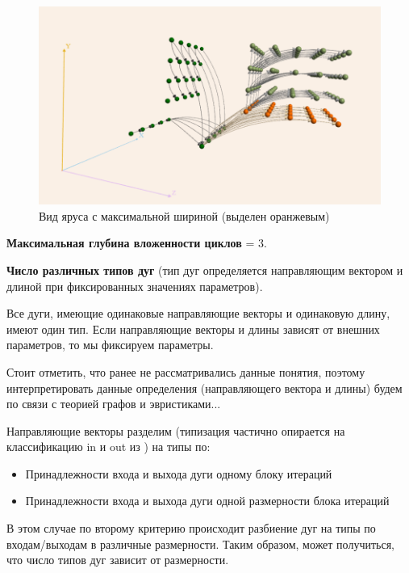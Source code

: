 \documentclass[12pt, fleqn]{article}
\theoremstyle{definition}
\newenvironment{packed_enum}{
\begin{enumerate}
  \setlength{\itemsep}{1pt}
  \setlength{\parskip}{0pt}
  \setlength{\parsep}{0pt}
}{\end{enumerate}}
\begin{document}
\begin{packed_enum}
 \begin{figure}[ht]
\begin{center}
 \includegraphics[scale=1]{max_lpf.png}
 \caption{Вид яруса с максимальной шириной (выделен оранжевым)}
 \label{fig:max_lpf}
\end{center}
\end{figure}

 \item \textbf{Максимальная глубина вложенности циклов} = 3.

 \item \textbf{Число различных типов дуг} (тип дуг определяется направляющим вектором и длиной при фиксированных значениях параметров).
 
 Все дуги, имеющие одинаковые направляющие векторы и одинаковую длину, имеют один тип. Если направляющие векторы и длины зависят от внешних параметров, то мы фиксируем параметры.
 
 Стоит отметить, что ранее не рассматривались данные понятия, поэтому интерпретировать данные определения (направляющего вектора и длины) будем по связи с теорией графов и эвристиками...
 
 Направляющие векторы разделим (типизация частично опирается на классификацию in и out из \cite{Voevodin02}) на типы по: 
 \begin{itemize}
 \setlength{\itemsep}{1pt}
  \item Принадлежности входа и выхода дуги одному блоку итераций
  \item Принадлежности входа и выхода дуги одной размерности блока итераций
 \end{itemize} 

 
 В этом случае по второму критерию происходит разбиение дуг на типы по входам/выходам в различные размерности. Таким образом, может получиться, что число типов дуг зависит от размерности.
 

\end{packed_enum}
\end{document}
